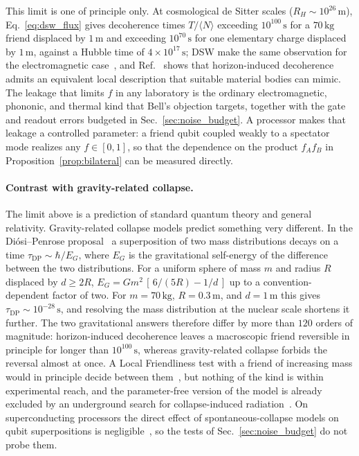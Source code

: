This limit is one of principle only. At cosmological de Sitter scales ($R_H \sim 10^{26}\,\mathrm{m}$), Eq.~\eqref{eq:dsw_flux} gives decoherence times $T / \langle N \rangle$ exceeding $10^{100}\,\mathrm{s}$ for a $70\,\mathrm{kg}$ friend displaced by $1\,\mathrm{m}$ and exceeding $10^{70}\,\mathrm{s}$ for one elementary charge displaced by $1\,\mathrm{m}$, against a Hubble time of $4 \times 10^{17}\,\mathrm{s}$; DSW make the same observation for the electromagnetic case~\cite{danielson2023}, and Ref.~\cite{danielson2025} shows that horizon-induced decoherence admits an equivalent local description that suitable material bodies can mimic. The leakage that limits $f$ in any laboratory is the ordinary electromagnetic, phononic, and thermal kind that Bell's objection targets, together with the gate and readout errors budgeted in Sec.~\ref{sec:noise_budget}. A processor makes that leakage a controlled parameter: a friend qubit coupled weakly to a spectator mode realizes any $f \in [0, 1]$, so that the dependence on the product $f_A f_B$ in Proposition~\ref{prop:bilateral} can be measured directly.

\paragraph{Contrast with gravity-related collapse.}
The limit above is a prediction of standard quantum theory and general relativity. Gravity-related collapse models predict something very different. In the Di\'osi--Penrose proposal~\cite{diosi1989,penrose1996} a superposition of two mass distributions decays on a time $\tau_{\mathrm{DP}} \sim \hbar / E_G$, where $E_G$ is the gravitational self-energy of the difference between the two distributions. For a uniform sphere of mass $m$ and radius $R$ displaced by $d \ge 2R$, $E_G = G m^2 \,[\,6/(5R) - 1/d\,]$ up to a convention-dependent factor of two. For $m = 70\,\mathrm{kg}$, $R = 0.3\,\mathrm{m}$, and $d = 1\,\mathrm{m}$ this gives $\tau_{\mathrm{DP}} \sim 10^{-28}\,\mathrm{s}$, and resolving the mass distribution at the nuclear scale shortens it further. The two gravitational answers therefore differ by more than $120$ orders of magnitude: horizon-induced decoherence leaves a macroscopic friend reversible in principle for longer than $10^{100}\,\mathrm{s}$, whereas gravity-related collapse forbids the reversal almost at once. A Local Friendliness test with a friend of increasing mass would in principle decide between them~\cite{wiseman2023}, but nothing of the kind is within experimental reach, and the parameter-free version of the model is already excluded by an underground search for collapse-induced radiation~\cite{donadi2021}. On superconducting processors the direct effect of spontaneous-collapse models on qubit superpositions is negligible~\cite{vischi2022}, so the tests of Sec.~\ref{sec:noise_budget} do not probe them.

